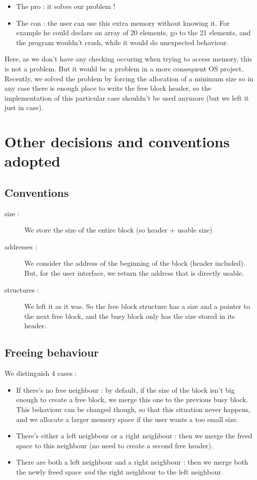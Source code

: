 \documentclass[twoside]{article}
\begin{document}
\begin{itemize}
	\item The pro : it solves our problem !
	\item The con : the user can use this extra memory without knowing it. For 
		example he could declare an array of 20 elements, go to the 21 elements,
		and the program wouldn't crash, while it would do unexpected behaviour.
\end{itemize}

Here, as we don't have any checking occuring when trying to access memory,
this is not a problem. But it would be a problem in a more consequent OS 
project.\\

Recently, we solved the problem by forcing the allocation of a minimum size
so in any case there is enough place to write the free block header, so the
implementation of this particular case shouldn't be used anymore (but we left it
just in case).

\section{Other decisions and conventions adopted}
\subsection{Conventions}
\begin{description}
	\item[size :] We store the size of the entire block (so header + usable 
		size)
	\item[addresses :] We consider the address of the beginning of the block
		(header included). But, for the user interface, we return the address
		that is directly usable.
	\item[structures :] We left it as it was. So the free block structure has
		a size and a pointer to the next free block, and the busy block only
		has the size stored in its header.
\end{description}

\subsection{Freeing behaviour}
We distinguish 4 cases :
\begin{itemize}
	\item If there's no free neighbour : by default, if the size of the block
		isn't big enough to create a free block, we merge this one to the
		previous busy block. This behaviour can be changed though, so that this
		situation never happens, and we allocate a larger memory space if the
		user wants a too small size.
	\item There's either a left neighbour or a right neighbour : then we merge
		the freed space to this neighbour (no need to create a second free
		header).
	\item There are both a left neighbour and a right neighbour : then we merge
		both the newly freed space \emph{and} the right neighbour to the left
		neighbour.
\end{itemize}
\end{document}
